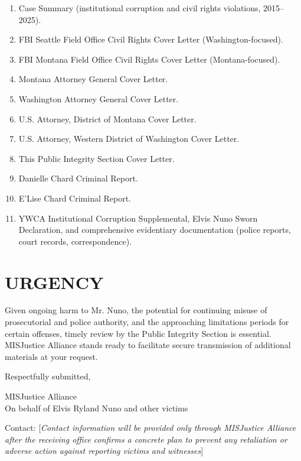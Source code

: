 \documentclass[12pt,oneside]{article}
\begin{document}
\begin{flushleft}
\begin{enumerate}
\item Case Summary (institutional corruption and civil rights violations, 2015--2025).
\item FBI Seattle Field Office Civil Rights Cover Letter (Washington-focused).
\item FBI Montana Field Office Civil Rights Cover Letter (Montana-focused).
\item Montana Attorney General Cover Letter.
\item Washington Attorney General Cover Letter.
\item U.S. Attorney, District of Montana Cover Letter.
\item U.S. Attorney, Western District of Washington Cover Letter.
\item This Public Integrity Section Cover Letter.
\item Danielle Chard Criminal Report.
\item E'Lise Chard Criminal Report.
\item YWCA Institutional Corruption Supplemental, Elvis Nuno Sworn Declaration, and comprehensive evidentiary documentation (police reports, court records, correspondence).
\end{enumerate}

\section*{URGENCY}

Given ongoing harm to Mr. Nuno, the potential for continuing misuse of prosecutorial and police authority, and the approaching limitations periods for certain offenses, timely review by the Public Integrity Section is essential. MISJustice Alliance stands ready to facilitate secure transmission of additional materials at your request.

\vspace{0.3in}

\noindent
Respectfully submitted,

\vspace{0.3in}

\noindent
MISJustice Alliance \\
On behalf of Elvis Ryland Nuno and other victims

\vspace{0.2in}

\noindent
Contact: [\textit{Contact information will be provided only through MISJustice Alliance after the receiving office confirms a concrete plan to prevent any retaliation or adverse action against reporting victims and witnesses}]

\end{flushleft}
\end{document}
